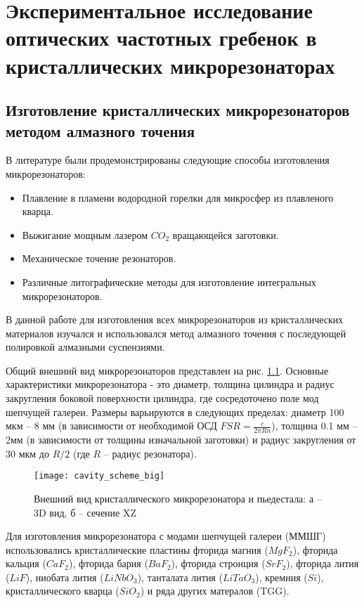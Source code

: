\chapter{Экспериментальное исследование оптических частотных гребенок в кристаллических микрорезонаторах} \label{chapt3}

\section{Изготовление кристаллических микрорезонаторов методом алмазного точения}

В литературе были продемонстрированы следующие способы изготовления микрорезонаторов:

\begin{itemize}
  \item Плавление в пламени водородной горелки для микросфер из плавленого кварца.
  \item Выжигание мощным лазером $CO_2$ вращающейся заготовки.
  \item Механическое точение резонаторов.
  \item Различные литографические методы для изготовление интегральных микрорезонаторов.
\end{itemize}

В данной работе для изготовления всех микрорезонаторов из кристаллических материалов изучался и использовался метод алмазного точения с последующей полировкой алмазными суспензиями.

Общий внешний вид микрорезонаторов представлен на рис. \ref{cavity_scheme_big}. Основные характеристики микрорезонатора - это диаметр, толщина цилиндра и радиус закругления боковой поверхности цилиндра, где сосредоточено поле мод шепчущей галереи.  Размеры варьируются в следующих пределах: диаметр 100 мкм – 8 мм (в зависимости от необходимой ОСД $FSR= \frac{c}{2\pi Rn}$), толщина 0.1 мм – 2мм (в зависимости от толщины изначальной заготовки) и радиус закругления от 30 мкм до $R/2$ (где $R$ – радиус резонатора).

\begin{figure}[ht]
    \centering
  \texttt{[image: cavity\_scheme\_big]}
  \caption{Внешний вид кристаллического микрорезонатора и пьедестала: а – 3D вид, б – сечение XZ}
  \label{cavity_scheme_big}
\end{figure}

Для изготовления микрорезонатора с модами шепчущей галереи (ММШГ) использовались кристаллические пластины фторида магния ($MgF_2$), фторида кальция ($CaF_2$), фторида бария ($BaF_2$), фторида стронция ($SrF_2$), фторида лития ($LiF$), ниобата лития ($LiNbO_3$), танталата лития ($LiTaO_3$), кремния ($Si$), кристаллического кварца ($SiO_2$) и ряда других матералов (TGG).


